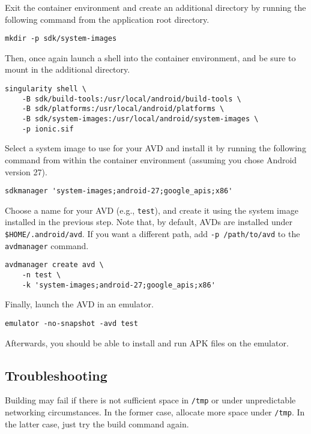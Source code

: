 \documentclass[12pt]{report}
\begin{document}
Exit the container environment and create an additional directory by running the
following command from the application root directory.

\begin{verbatim}
mkdir -p sdk/system-images
\end{verbatim}

Then, once again launch a shell into the container environment, and be sure to
mount in the additional directory.

\begin{verbatim}
singularity shell \
    -B sdk/build-tools:/usr/local/android/build-tools \
    -B sdk/platforms:/usr/local/android/platforms \
    -B sdk/system-images:/usr/local/android/system-images \
    -p ionic.sif
\end{verbatim}

Select a system image to use for your AVD and install it by running the
following command from within the container environment (assuming you chose
Android version 27).

\begin{verbatim}
sdkmanager 'system-images;android-27;google_apis;x86'
\end{verbatim}

Choose a name for your AVD (e.g., \texttt{test}), and create it using the system
image installed in the previous step. Note that, by default, AVDs are installed
under \texttt{\$HOME/.android/avd}. If you want a different path, add \texttt{-p
/path/to/avd} to the \texttt{avdmanager} command.

\begin{verbatim}
avdmanager create avd \
    -n test \
    -k 'system-images;android-27;google_apis;x86'
\end{verbatim}

Finally, launch the AVD in an emulator.

\begin{verbatim}
emulator -no-snapshot -avd test
\end{verbatim}

Afterwards, you should be able to install and run APK files on the emulator.

        \subsection{Troubleshooting}

Building may fail if there is not sufficient space in \texttt{/tmp} or under
unpredictable networking circumstances. In the former case, allocate more space
under \texttt{/tmp}. In the latter case, just try the build command again.
\end{document}
